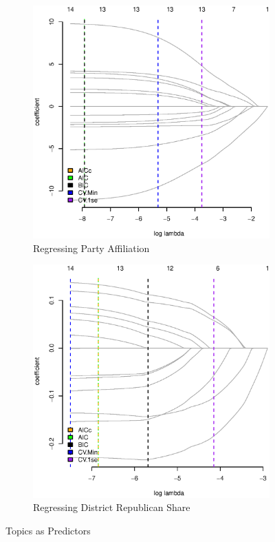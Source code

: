 \documentclass[11pt, fleqn]{article}
\begin{document}


\begin{figure}
  \centering
  \begin{subfigure}[b]{0.49\textwidth}
    \includegraphics[width=\textwidth]{tpcs_rep.eps}
    \caption{Regressing Party Affiliation}
    \label{fig:tpcs_rep}
  \end{subfigure}
  \hfill
  \begin{subfigure}[b]{0.49\textwidth}
    \includegraphics[width=\textwidth]{tpcs_rep_share.eps}
    \caption{Regressing District Republican Share}
    \label{fig:tpcs_repshare}
  \end{subfigure}
  \caption{Topics as Predictors}
\end{figure}
\end{document}
